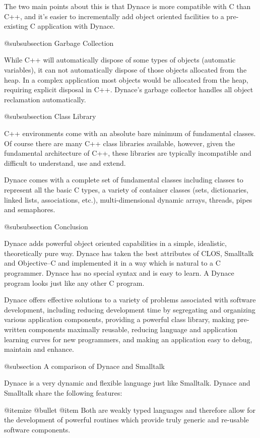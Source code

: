 The two main points about this is that Dynace is more compatible with
C than C++, and it's easier to incrementally add object oriented
facilities to a pre-existing C application with Dynace.


@subsubsection Garbage Collection

While C++ will automatically dispose of some types of objects (automatic
variables), it can not automatically dispose of those objects allocated
from the heap.  In a complex application most objects would be allocated
from the heap, requiring explicit disposal in C++.  Dynace's garbage collector
handles all object reclamation automatically.


@subsubsection Class Library

C++ environments come with an absolute bare minimum of fundamental classes.
Of course there are many C++ class libraries available, however, given
the fundamental architecture of C++, these libraries are typically
incompatible and difficult to understand, use and extend.

Dynace comes with a complete set of fundamental classes including classes
to represent all the basic C types, a variety of container classes (sets,
dictionaries, linked lists, associations, etc.), multi-dimensional dynamic
arrays, threads, pipes and semaphores.


@subsubsection Conclusion


Dynace adds powerful object oriented capabilities in a simple,
idealistic, theoretically pure way.  Dynace has taken the best
attributes of CLOS, Smalltalk and Objective--C and implemented it in a
way which is natural to a C programmer.  Dynace has no special syntax
and is easy to learn.  A Dynace program looks just like any other C
program.

Dynace offers effective solutions to a variety of problems associated
with software development, including reducing development time by
segregating and organizing various application components, providing a
powerful class library, making pre-written components maximally
reusable, reducing language and application learning curves for new
programmers, and making an application easy to debug, maintain and
enhance.



@subsection A comparison of Dynace and Smalltalk


Dynace is a very dynamic and flexible language just like
Smalltalk.  Dynace and Smalltalk share the following features:

@itemize @bullet
@item
Both are weakly typed languages and therefore allow
for the development of powerful routines which provide truly generic
and re-usable software components.

